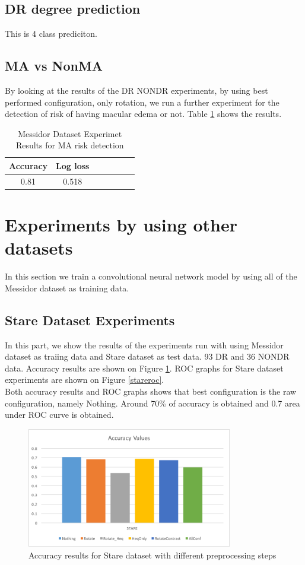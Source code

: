 \subsection{DR degree prediction}
This is 4 class prediciton.
\subsection{MA vs NonMA}
By looking at the results of the DR NONDR experiments, by using best performed configuration, only rotation, we run a further experiment for the detection of risk of having macular edema or not. Table \ref{tab:msdma} shows the results.  

\begin{table}[t]
\centering
\caption{Messidor Dataset Experimet Results for MA risk detection} \label{tab:msdma}
\begin{tabular}{|c|c|c|c|c|c|c|} \hline
 Accuracy & Log loss \\ \hline
 0.81 & 0.518\\ \hline
\end{tabular}
\end{table}

\section{Experiments by using other datasets}
In this section we train a convolutional neural network model by using all of the Messidor dataset as training data. 
\subsection{Stare Dataset Experiments}
In this part, we show the results of the experiments run with using Messidor dataset as traiing data and Stare dataset as test data. 93 DR and 36 NONDR data. Accuracy results are shown on Figure \ref{stareacc}. ROC graphs for Stare dataset experiments are shown on Figure \ref{stareroc}.\\
Both accuracy results and ROC graphs shows that best configuration is the raw configuration, namely Nothing. Around 70\% of accuracy is obtained and 0.7 area under ROC curve is obtained.   

\begin{figure}[!htbbp]
\centering
\includegraphics[width=0.8\textwidth]{Figures/stareacc.png}
\caption{Accuracy results for Stare dataset with different preprocessing steps}
\label{stareacc}
\end{figure}

